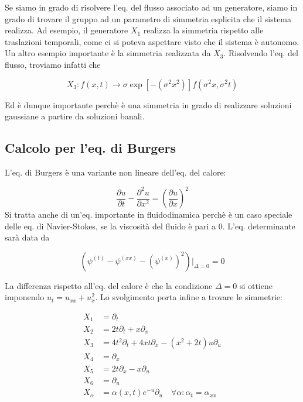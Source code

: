 \documentclass{report}
\begin{document}
Se siamo in grado di risolvere l'eq. del flusso associato ad un generatore, siamo in grado di trovare il gruppo ad un parametro di simmetria esplicita che il sistema realizza. Ad esempio, il generatore $X_1$ realizza la simmetria rispetto alle traslazioni temporali, come ci si poteva aspettare visto che il sistema è autonomo. \\

Un altro esempio importante è la simmetria realizzata da $X_3$. Risolvendo l'eq. del flusso, troviamo infatti che

\begin{equation}
    X_3 : f(x, t) \rightarrow \sigma\exp{[-(\sigma^2 x^2)]}f(\sigma^2x, \sigma^2t)
\end{equation}

Ed è dunque importante perchè è una simmetria in grado di realizzare soluzioni gaussiane a partire da soluzioni banali. 

\subsection{Calcolo per l'eq. di Burgers}

L'eq. di Burgers è una variante non lineare dell'eq. del calore: 

\begin{equation}
    \frac{\partial u}{\partial t} - \frac{\partial^2 u}{\partial x^2} = \left(\frac{\partial u}{\partial x} \right)^2
\end{equation}
Si tratta anche di un'eq. importante in fluidodinamica perchè è un caso speciale delle eq. di Navier-Stokes, se la viscosità del fluido è pari a 0.
L'eq. determinante sarà data da 

\begin{equation}
    (\psi^{(t)} - \psi^{(xx)} - (\psi^{(x)})^2)|_{\Delta =0} = 0 
\end{equation}

La differenza rispetto all'eq. del calore è che la condizione $\Delta =0$ si ottiene imponendo $u_t = u_{xx} + u_x^2$. Lo svolgimento porta infine a trovare le simmetrie: 

\begin{align}
    X_1 &= \partial_t \\
    X_2 &= 2t\partial_t + x\partial_x \\
    X_3 &= 4t^2\partial_t + 4xt\partial_x - (x^2 + 2t)u\partial_u \\
    X_4 &= \partial_x \\
    X_5 &= 2t\partial_x - x\partial_u \\
    X_6 &= \partial_u \\
    X_\alpha &= \alpha(x, t)e^{-u}\partial_u \quad \forall \alpha : \alpha_t = \alpha_{xx}
\end{align}
\end{document}

